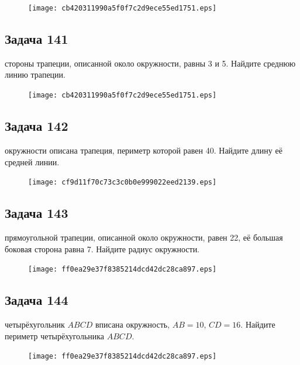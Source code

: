 \documentclass[a4paper,10pt]{article} %
\begin{document}
\begin{spacing}{1.0}
{\vspace{1.5cm}

\begin{figure}{\texttt{[image: cb420311990a5f0f7c2d9ece55ed1751.eps]}}\end{figure}
\subsection*{Задача 141}
 стороны трапеции, описанной около окружности, равны 3 и 5. Найдите среднюю линию трапеции.

\vspace{1.5cm}

\begin{figure}{\texttt{[image: cb420311990a5f0f7c2d9ece55ed1751.eps]}}\end{figure}
\subsection*{Задача 142}
 окружности описана трапеция, периметр которой равен 40. Найдите длину её средней линии.

\vspace{1.5cm}

\begin{figure}{\texttt{[image: cf9d11f70c73c3c0b0e999022eed2139.eps]}}\end{figure}
\subsection*{Задача 143}
 прямоугольной трапеции, описанной около окружности, равен 22, её большая боковая сторона равна 7. Найдите радиус окружности.

\vspace{1.5cm}

\begin{figure}{\texttt{[image: ff0ea29e37f8385214dcd42dc28ca897.eps]}}\end{figure}
\subsection*{Задача 144}
 четырёхугольник $ABCD$ вписана окружность, $AB=10$, $CD=16$. Найдите периметр четырёхугольника $ABCD$.

\vspace{1.5cm}

\begin{figure}{\texttt{[image: ff0ea29e37f8385214dcd42dc28ca897.eps]}}\end{figure}
}
\end{spacing}
\end{document}
